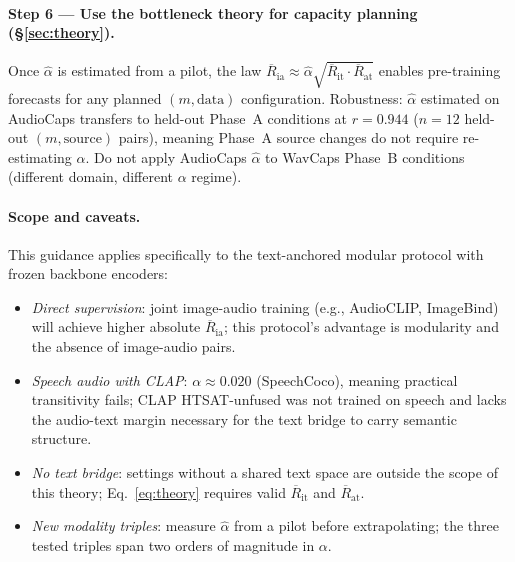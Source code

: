 \documentclass{article}
\newcommand{\avgR}{\overline{R}}
\begin{document}
\paragraph{Step 6 --- Use the bottleneck theory for capacity planning (§\ref{sec:theory}).}
Once $\hat{\alpha}$ is estimated from a pilot, the law
$\avgR_\mathrm{ia} \approx \hat{\alpha}\sqrt{\avgR_\mathrm{it}\cdot\avgR_\mathrm{at}}$
enables pre-training forecasts for any planned $(m, \text{data})$ configuration.
Robustness: $\hat{\alpha}$ estimated on AudioCaps transfers to held-out Phase~A conditions
at $r=0.944$ ($n=12$ held-out $(m, \text{source})$ pairs), meaning Phase~A source changes do not
require re-estimating $\alpha$.
Do not apply AudioCaps $\hat{\alpha}$ to WavCaps Phase~B conditions (different domain, different
$\alpha$ regime).

\paragraph{Scope and caveats.}
This guidance applies specifically to the text-anchored modular protocol with frozen backbone
encoders:
\begin{itemize}[topsep=2pt,itemsep=1pt,parsep=0pt]
  \item \emph{Direct supervision}: joint image-audio training (e.g., AudioCLIP, ImageBind) will
    achieve higher absolute $\avgR_\mathrm{ia}$; this protocol's advantage is modularity and the
    absence of image-audio pairs.
  \item \emph{Speech audio with CLAP}: $\alpha \approx 0.020$ (SpeechCoco), meaning practical
    transitivity fails; CLAP HTSAT-unfused was not trained on speech and lacks the audio-text
    margin necessary for the text bridge to carry semantic structure.
  \item \emph{No text bridge}: settings without a shared text space are outside the scope of this
    theory; Eq.~\ref{eq:theory} requires valid $\avgR_\mathrm{it}$ and $\avgR_\mathrm{at}$.
  \item \emph{New modality triples}: measure $\hat{\alpha}$ from a pilot before extrapolating;
    the three tested triples span two orders of magnitude in $\alpha$.
\end{itemize}


\end{document}

